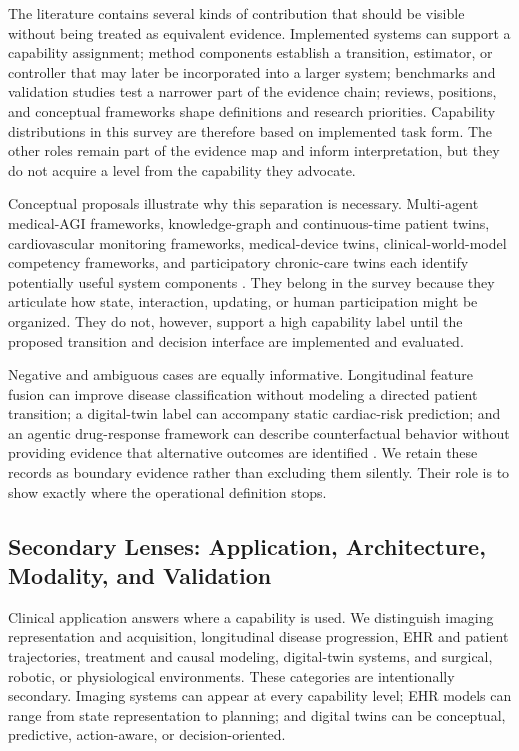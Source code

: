 The literature contains several kinds of contribution that should be visible without being treated as equivalent evidence. Implemented systems can support a capability assignment; method components establish a transition, estimator, or controller that may later be incorporated into a larger system; benchmarks and validation studies test a narrower part of the evidence chain; reviews, positions, and conceptual frameworks shape definitions and research priorities. Capability distributions in this survey are therefore based on implemented task form. The other roles remain part of the evidence map and inform interpretation, but they do not acquire a level from the capability they advocate.

Conceptual proposals illustrate why this separation is necessary. Multi-agent medical-AGI frameworks, knowledge-graph and continuous-time patient twins, cardiovascular monitoring frameworks, medical-device twins, clinical-world-model competency frameworks, and participatory chronic-care twins each identify potentially useful system components \citep{Morales2026LeJEPAIJEPA,Nye2023DigitalTwinsPatient,Iyer2025DesignanalysisTwinCardio,Riascos2022ConceptualApproachDigital,SafaviNaini2026GroundingClinicalAi,Li2026ParticipatoryDigitalTwins}. They belong in the survey because they articulate how state, interaction, updating, or human participation might be organized. They do not, however, support a high capability label until the proposed transition and decision interface are implemented and evaluated.

Negative and ambiguous cases are equally informative. Longitudinal feature fusion can improve disease classification without modeling a directed patient transition; a digital-twin label can accompany static cardiac-risk prediction; and an agentic drug-response framework can describe counterfactual behavior without providing evidence that alternative outcomes are identified \citep{Muksimova2025MultiModalFusion,Zia2025EfficientNetDigitalTwin,Baker2026ContextualInvertibleWorld}. We retain these records as boundary evidence rather than excluding them silently. Their role is to show exactly where the operational definition stops.

\subsection{Secondary Lenses: Application, Architecture, Modality, and Validation}

Clinical application answers where a capability is used. We distinguish imaging representation and acquisition, longitudinal disease progression, EHR and patient trajectories, treatment and causal modeling, digital-twin systems, and surgical, robotic, or physiological environments. These categories are intentionally secondary. Imaging systems can appear at every capability level; EHR models can range from state representation to planning; and digital twins can be conceptual, predictive, action-aware, or decision-oriented.

